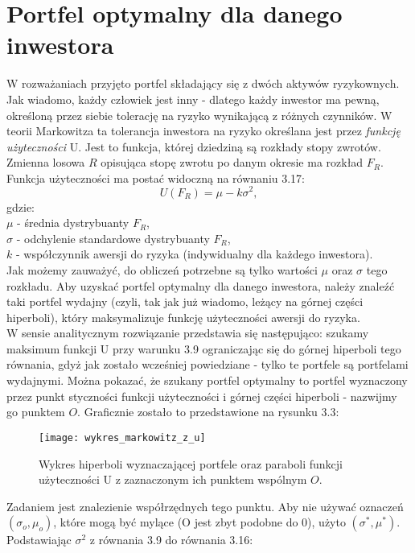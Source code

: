 \documentclass[magister]{dyplom}
\begin{document}
\section{Portfel optymalny dla danego inwestora}
W rozważaniach przyjęto portfel składający się z dwóch aktywów ryzykownych. Jak wiadomo, każdy człowiek jest inny - dlatego każdy inwestor ma pewną, określoną przez siebie tolerację na ryzyko wynikającą z różnych czynników. W teorii Markowitza ta tolerancja inwestora na ryzyko określana jest przez \textit{funkcję użyteczności} U. Jest to funkcja, której dziedziną są rozkłady stopy zwrotów. Zmienna losowa $R$ opisująca stopę zwrotu po danym okresie ma rozkład $F_R$. Funkcja użyteczności ma postać widoczną na równaniu 3.17:
\begin{equation}
U(F_R) = \mu - k\sigma^2,
\end{equation}
gdzie:\\
$\mu$ - średnia dystrybuanty $F_R$,\\
$\sigma$ - odchylenie standardowe dystrybuanty $F_R$,\\
$k$ - współczynnik awersji do ryzyka (indywidualny dla każdego inwestora).\\
Jak możemy zauważyć, do obliczeń potrzebne są tylko wartości $\mu$ oraz $\sigma$ tego rozkładu. Aby uzyskać portfel optymalny dla danego inwestora, należy znaleźć taki portfel wydajny (czyli, tak jak już wiadomo, leżący na górnej części hiperboli), który maksymalizuje funkcję użyteczności awersji do ryzyka.\\
W sensie analitycznym rozwiązanie przedstawia się następująco: szukamy maksimum funkcji U przy warunku 3.9 ograniczając się do górnej hiperboli tego równania, gdyż jak zostało wcześniej powiedziane - tylko te portfele są portfelami wydajnymi. Można pokazać, że szukany portfel optymalny to portfel wyznaczony przez punkt styczności funkcji użyteczności i górnej części hiperboli - nazwijmy go punktem $O$. Graficznie zostało to przedstawione na rysunku 3.3:\\
\newpage
\begin{figure}[h]
	\centering
	\texttt{[image: wykres\_markowitz\_z\_u]}
	\caption{Wykres hiperboli wyznaczającej portfele oraz paraboli funkcji użyteczności U z zaznaczonym ich punktem wspólnym $O$.}
\end{figure}

Zadaniem jest znalezienie współrzędnych tego punktu. Aby nie używać oznaczeń $(\sigma_o, \mu_o)$, które mogą być mylące (O jest zbyt podobne do 0), użyto $(\sigma^*, \mu^*)$. Podstawiając $\sigma^2$ z równania 3.9 do równania 3.16:
\end{document}
